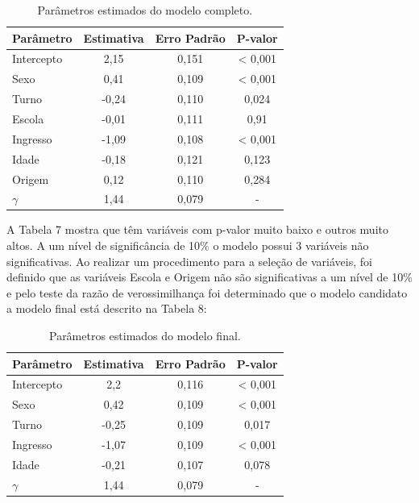 \documentclass[a4paper,12pt]{article}
\begin{document}
\begin{table}[H]
\centering
\caption{Parâmetros estimados do modelo completo.}
\begin{tabular}{lccc}
  \hline
 Parâmetro & Estimativa & Erro Padrão & P-valor \\ 
  \hline
  Intercepto & 2,15 & 0,151  & < 0,001 \\
  
  Sexo & 0,41 & 0,109 & < 0,001  \\
  
  Turno & -0,24 & 0,110 & 0,024  \\ 
  
  Escola & -0,01 & 0,111 & 0,91  \\ 
  
  Ingresso & -1,09 & 0,108 & < 0,001  \\ 
  
  Idade & -0,18 & 0,121 & 0,123  \\ 
  
  Origem & 0,12 & 0,110 & 0,284  \\ 
  
  $\gamma$ & 1,44 & 0,079 & -  \\ 
   \hline
\end{tabular}
\end{table}

A Tabela 7 mostra que têm variáveis com p-valor muito baixo e outros muito altos. A um nível de significância de 10\% o modelo possui 3 variáveis não significativas. Ao realizar um procedimento para a seleção de variáveis, foi definido que as variáveis Escola e Origem não são significativas a um nível de 10\% e pelo teste da razão de verossimilhança foi determinado que o modelo candidato a modelo final está descrito na Tabela 8:

\begin{table}[H]
\centering
\caption{Parâmetros estimados do modelo final.}
\begin{tabular}{lccc}
  \hline
 Parâmetro & Estimativa & Erro Padrão & P-valor \\ 
  \hline
  Intercepto & 2,2 & 0,116  & < 0,001 \\
  
  Sexo & 0,42 & 0,109 & < 0,001  \\
  
  Turno & -0,25 & 0,109 & 0,017  \\ 
  
  Ingresso & -1,07 & 0,109 & < 0,001  \\ 
  
  Idade & -0,21 & 0,107 & 0,078  \\ 
  
  $\gamma$ & 1,44 & 0,079 & -  \\ 
   \hline
\end{tabular}
\end{table}
\end{document}
